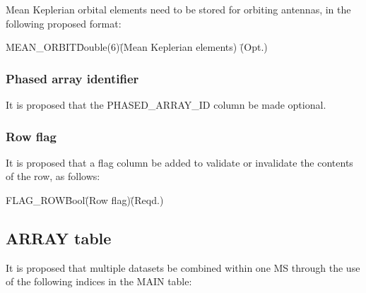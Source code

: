 \documentclass{article}
\begin{document}
Mean Keplerian orbital elements need to be stored for orbiting
antennas, in the following proposed format:

\begin{tabbing}
MEAN\_ORBIT\quad\quad \= Double(6)\quad\quad \= (Mean Keplerian elements)
 \quad\quad \= (Opt.) \\
\end{tabbing}

\subsubsection{Phased array identifier}

It is proposed that the PHASED\_ARRAY\_ID column be made optional.

\subsubsection{Row flag}

It is proposed that a flag column be added to validate or invalidate
the contents of the row, as follows:

\begin{tabbing}
FLAG\_ROW\quad\quad \= Bool\quad\quad \= (Row flag)\quad\quad \= (Reqd.)\\
\end{tabbing}

\subsection{ARRAY table}

It is proposed that multiple datasets be combined within one MS
through the use of the following indices in the MAIN table:
\end{document}
